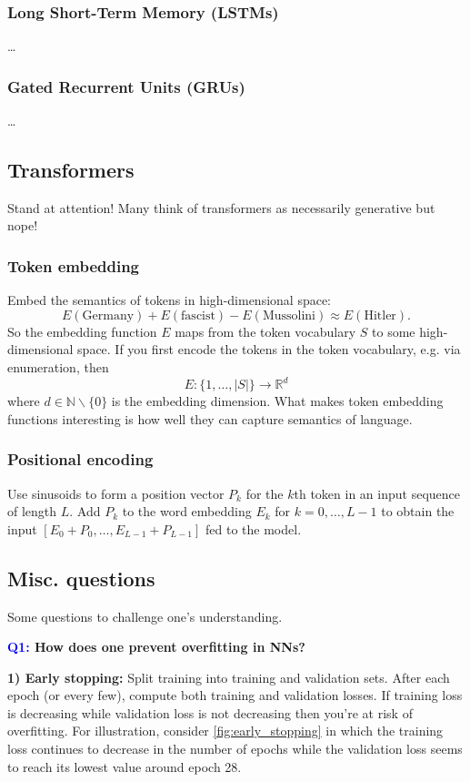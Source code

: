 \documentclass[11pt]{article}
\begin{document}
\subsubsection{Long Short-Term Memory (LSTMs)}
\dots

\subsubsection{Gated Recurrent Units (GRUs)}
\dots

\subsection{Transformers}
Stand at attention! Many think of transformers as necessarily generative but nope!

\subsubsection{Token embedding}
Embed the semantics of tokens in high-dimensional space:
$$
E(\text{Germany})
+E(\text{fascist})
-E(\text{Mussolini})
\approx
E(\text{Hitler}).
$$
So the embedding function $E$ maps from the token vocabulary $S$ to some high-dimensional space. If you first encode the tokens in the token vocabulary, e.g. via enumeration, then
$$
E:\{1,\dots,|S|\}\to\mathbb{R}^d
$$
where $d\in\mathbb{N}\backslash\{0\}$ is the embedding dimension. What makes token embedding functions interesting is how well they can capture semantics of language.

\subsubsection{Positional encoding}
Use sinusoids to form a position vector $P_k$ for the $k$th token in an input sequence of length $L$. Add $P_k$ to the word embedding $E_k$ for $k=0,\dots,L-1$ to obtain the input $[E_0+P_0,\dots,E_{L-1}+P_{L-1}]$ fed to the model.

\subsection{Misc. questions}

Some questions to challenge one's understanding.

\begin{center}
    \textbf{\textcolor{blue}{Q1:} How does one prevent overfitting in NNs?}
\end{center}
\textbf{1) Early stopping:} Split training into training and validation sets. After each epoch (or every few), compute both training and validation losses. If training loss is decreasing while validation loss is not decreasing then you're at risk of overfitting. For illustration, consider \autoref{fig:early_stopping} in which the training loss continues to decrease in the number of epochs while the validation loss seems to reach its lowest value around epoch 28.
\end{document}
